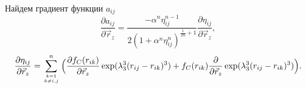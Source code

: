Найдем градиент функции $a_{ij}$
\begin{equation}
\frac{\partial a_{ij}}{\partial \vec{r}_z} = \frac{- \alpha^n \eta^{n-1}_{ij}}{2(1 + \alpha^n \eta^n_{ij})^{\frac{1}{2n} + 1}} \frac{\partial \eta_{ij}}{\partial \vec{r}_z},
\end{equation}
\begin{equation*}
\frac{\partial \eta_{ij}}{\partial \vec{r}_z} = \displaystyle\sum_{k=1 \atop k \neq i, j}^{n} \Big( \frac{\partial f_C(r_{ik})}{\partial \vec{r}_z}  \exp(\lambda^3_3(r_{ij} - r_{ik})^3) +  f_C(r_{ik}) \frac{\partial}{\partial \vec{r}_z}\exp(\lambda^3_3(r_{ij} - r_{ik})^3) \Big).
\end{equation*}